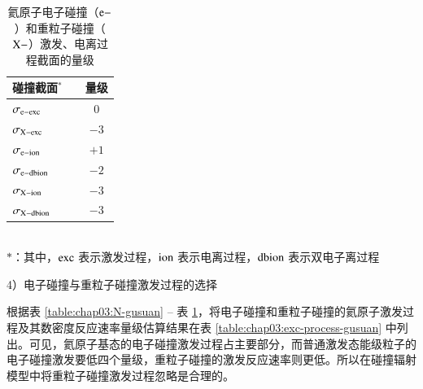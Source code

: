 \begin{table}%
\caption{氦原子电子碰撞（${\rm e-}$）和重粒子碰撞（${\rm X-}$）激发、电离过程截面的量级}
\label{table:chap03:sigma-gusuan}
\begin{center}
\begin{tabular}{lcc}\toprule[1.5pt]
碰撞截面$^*$ & & 量级 \\
\midrule[1pt]
\hspace{0.5em}$\sigma_{\rm e-exc}$ & & \hspace{0.5em}$0$ \\
\hspace{0.5em}$\sigma_{\rm X-exc}$ & & $-3$ \\%
\hspace{0.5em}$\sigma_{\rm e-ion}$ & & $+1$ \\
\hspace{0.5em}$\sigma_{\rm e-dbion}$ & & $-2$ \\
\hspace{0.5em}$\sigma_{\rm X-ion}$ & & $-3$ \\
\hspace{0.5em}$\sigma_{\rm X-dbion}$ & & $-3$ \\
\bottomrule[1.5pt]
\end{tabular}\\[0.5em]
{\small $*$：其中，${\rm exc}$ 表示激发过程，${\rm ion}$ 表示电离过程，${\rm dbion}$ 表示双电子离过程}
\end{center}
\end{table}

4）电子碰撞与重粒子碰撞激发过程的选择

根据表 \ref{table:chap03:N-gusuan} -- 表 \ref{table:chap03:sigma-gusuan}，将电子碰撞和重粒子碰撞的氦原子激发过程及其数密度反应速率量级估算结果在表 \ref{table:chap03:exc-process-gusuan} 中列出。可见，氦原子基态的电子碰撞激发过程占主要部分，而普通激发态能级粒子的电子碰撞激发要低四个量级，重粒子碰撞的激发反应速率则更低。所以在碰撞辐射模型中将重粒子碰撞激发过程忽略是合理的。

